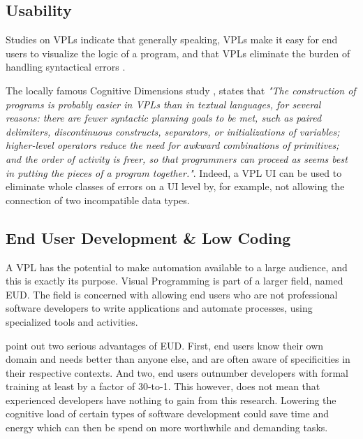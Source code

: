 \subsection{Usability}

Studies on \ac{VPL}s indicate that generally speaking, VPLs make it easy for end users to visualize the logic of a program, and that VPLs eliminate the burden of handling syntactical errors \cite{kuhail_characterizing_2021}.

The locally famous Cognitive Dimensions study \cite{green_usability_1996}, states that \emph{"The construction of programs is probably easier in VPLs than in textual languages, for several reasons: 
there are fewer syntactic planning goals to be met, such as paired delimiters, discontinuous constructs, separators, or initializations of variables; 
higher-level operators reduce the need for awkward combinations of primitives; 
and the order of activity is freer, so that programmers can proceed as seems best in putting the pieces of a program together."}. 
Indeed, a VPL UI can be used to eliminate whole classes of errors on a UI level by, for example, not allowing the connection of two incompatible data types. 



\subsection{End User Development \& Low Coding}
A \ac{VPL} has the potential to make automation available to a large audience, and this is exactly its purpose. 
Visual Programming is part of a larger field, named \ac{EUD}. 
The field is concerned with allowing end users who are not professional software developers to write applications and automate processes, using specialized tools and activities. 

\citet{kuhail_characterizing_2021} point out two serious advantages of EUD. 
First, end users know their own domain and needs better than anyone else, and are often aware of specificities in their respective contexts. 
And two, end users outnumber developers with formal training at least by a factor of 30-to-1.
This however, does not mean that experienced developers have nothing to gain from this research. 
Lowering the cognitive load of certain types of software development could save time and energy which can then be spend on more worthwhile and demanding tasks. 

